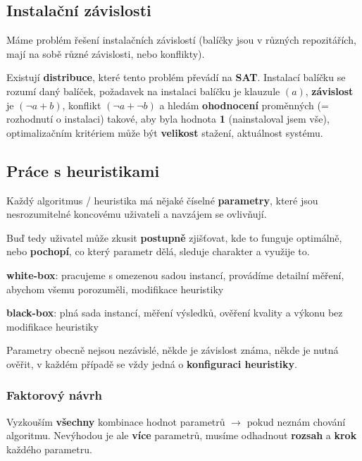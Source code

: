 \subsection{Instalační závislosti}

Máme problém řešení instalačních závislostí (balíčky jsou v různých repozitářích, mají na sobě různé závislosti, nebo konflikty).

\vspace{4pt}
\noindent Existují \textbf{distribuce}, které tento problém převádí na \textbf{SAT}. Instalací balíčku se rozumí daný balíček, požadavek na instalaci balíčku je klauzule $(a)$, \textbf{závislost} je $(\lnot a + b)$, konflikt $(\lnot a + \lnot b)$ a hledám \textbf{ohodnocení} proměnných (= rozhodnutí o instalaci) takové, aby byla hodnota \textbf{1} (nainstaloval jsem vše), optimalizačním kritériem může být \textbf{velikost} stažení, aktuálnost systému.

\subsection{Práce s heuristikami}

Každý algoritmus / heuristika má nějaké číselné \textbf{parametry}, které jsou nesrozumitelné koncovému uživateli a navzájem se ovlivňují.

\vspace{4pt}
\noindent Buď tedy uživatel může zkusit \textbf{postupně} zjišťovat, kde to funguje optimálně, nebo \textbf{pochopí}, co který parametr dělá, sleduje charakter a využije to.

\vspace{4pt}
\noindent \textbf{white-box}: pracujeme s omezenou sadou instancí, provádíme detailní měření, abychom všemu porozuměli, modifikace heuristiky

\vspace{4pt}
\noindent \textbf{black-box}: plná sada instancí, měření výsledků, ověření kvality a výkonu bez modifikace heuristiky

\vspace{4pt}
\noindent Parametry obecně nejsou nezávislé, někde je závislost známa, někde je nutná ověřit, v každém případě se vždy jedná o \textbf{konfiguraci heuristiky}.

\subsubsection{Faktorový návrh}

Vyzkouším \textbf{všechny} kombinace hodnot parametrů $\to$ pokud neznám chování algoritmu. Nevýhodou je ale \textbf{více} parametrů, musíme odhadnout \textbf{rozsah} a \textbf{krok} každého parametru.

